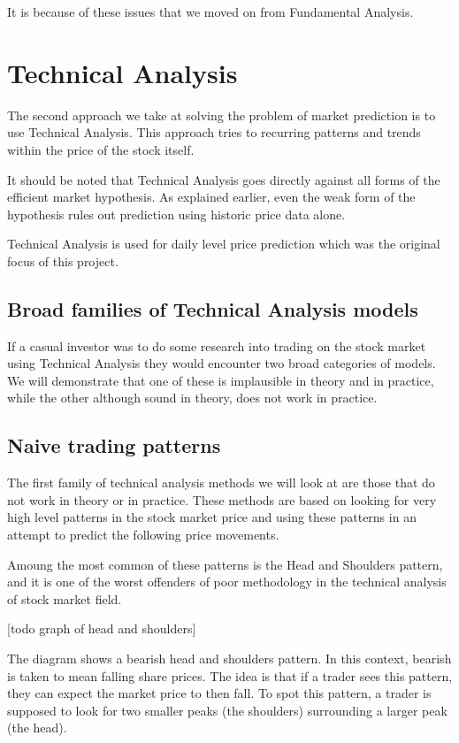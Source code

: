 \documentclass{report}
\begin{document}
It is because of these issues that we moved on from Fundamental Analysis.

\chapter{Technical Analysis}


The second approach we take at solving the problem of market prediction is to use Technical Analysis. This approach tries to recurring patterns and trends within the price of the stock itself.

It should be noted that Technical Analysis goes directly against all forms of the efficient market hypothesis. As explained earlier, even the weak form of the hypothesis rules out prediction using historic price data alone.

Technical Analysis is used for daily level price prediction which was the original focus of this project. 

\section{Broad families of Technical Analysis models}

If a casual investor was to do some research into trading on the stock market using Technical Analysis they would encounter two broad categories of models. We will demonstrate that one of these is implausible in theory and in practice, while the other although sound in theory, does not work in practice.

\section{Naive trading patterns}

The first family of technical analysis methods we will look at are those that do not work in theory or in practice. These methods are based on looking for very high level patterns in the stock market price and using these patterns in an attempt to predict the following price movements.

Amoung the most common of these patterns is the Head and Shoulders pattern, and it is one of the worst offenders of poor methodology in the technical analysis of stock market field.

[todo graph of head and shoulders]

The diagram shows a bearish head and shoulders pattern. In this context, bearish is taken to mean falling share prices. The idea is that if a trader sees this pattern, they can expect the market price to then fall. To spot this pattern, a trader is supposed to look for two smaller peaks (the shoulders) surrounding a larger peak (the head). 
\end{document}
